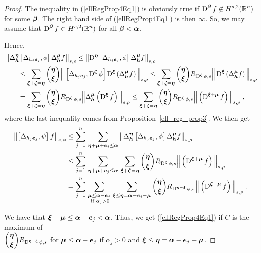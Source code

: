 \begin{proof}
The inequality in (\ref{ellRegProp4Eq1}) is obviously true if
$\displaystyle \operatorname{D}^{{\bm{\beta}}} f \not\in H^{s,2}(\mathbb{R}^n)$ for some
${\bm{\beta}}$.
The right hand side of (\ref{ellRegProp4Eq1}) is then $\infty$.  So, we may
assume that $\displaystyle \operatorname{D}^{{\bm{\beta}}} f \in H^{s,2}(\mathbb{R}^n)$ for all
${\bm{\beta}} < {\bm{\alpha}}$.

Hence,
\begin{align*}
&\left\| \Delta^{{\bm{\eta}}}_{{\bm{h}}} \left[
\Delta_{h_j {\bm{e}}_j}, \phi\right] \Delta^{{\bm{\mu}}}_{{\bm{h}}} f
\right\|_{s,\rho}
\leq \left\| \operatorname{D}^{{\bm{\eta}}} \left[ \Delta_{h_j {\bm{e}}_j}, \phi\right]
\Delta^{{\bm{\mu}}}_{{\bm{h}}} f\right\|_{s,\rho} \\
&\qquad \leq \sum_{{\bm{\xi}}+{\bm{\zeta}} = {\bm{\eta}}}
\binom{{\bm{\eta}}}{{\bm{\xi}}}
\Big\| \left[ \Delta_{h_j{\bm{e}}_j} , \operatorname{D}^{{\bm{\zeta}}} \phi \right]
\operatorname{D}^{{\bm{\xi}}} \left(\Delta^{{\bm{\mu}}}_{{\bm{h}}} f\right) \Big\|_{s,\rho}
\leq \sum_{{\bm{\xi}}+{\bm{\zeta}} = {\bm{\eta}}} \binom{{\bm{\eta}}}{{\bm{\xi}}}
R_{\operatorname{D}^{{\bm{\zeta}}} \phi,s}
\Big\| \operatorname{D}^{{\bm{\xi}}} \left(\Delta^{{\bm{\mu}}}_{{\bm{h}}} f\right)
\Big\|_{s,\rho} \\
&\qquad =\sum_{{\bm{\xi}}+{\bm{\zeta}} = {\bm{\eta}}}
\binom{{\bm{\eta}}}{{\bm{\xi}}} R_{\operatorname{D}^{{\bm{\zeta}}} \phi,s}
\Big\| \Delta^{{\bm{\mu}}}_{{\bm{h}}}
\left(\operatorname{D}^{{\bm{\xi}}} f\right) \Big\|_{s,\rho}
\leq \sum_{{\bm{\xi}}+{\bm{\zeta}} = {\bm{\eta}}} \binom{{\bm{\eta}}}{{\bm{\xi}}}
R_{\operatorname{D}^{{\bm{\zeta}}} \phi,s}
\Big\| \left(\operatorname{D}^{{\bm{\xi}}+{\bm{\mu}}} f\right) \Big\|_{s,\rho} \ ,
\end{align*}
where the last inequality comes from Proposition~\ref{ell_reg_prop3}.
We then get
\begin{align*}
\left\| \left[ \Delta_{h_j{\bm{e}}_j} ,\psi \right] f \right\|_{s,\rho}
&\leq \sum_{j=1}^n \, \sum_{{\bm{\eta}}+{\bm{\mu}}+{\bm{e}}_j \leq {\bm{\alpha}}}
\left\| \Delta^{{\bm{\eta}}}_{{\bm{h}}} \left[ \Delta_{h_j {\bm{e}}_j},
\phi\right] \Delta^{{\bm{\mu}}}_{{\bm{h}}} f \right\|_{s,\rho} \\
&\leq \sum_{j=1}^n \, \sum_{{\bm{\eta}}+{\bm{\mu}}+{\bm{e}}_j \leq {\bm{\alpha}}} \,
\sum_{{\bm{\xi}}+{\bm{\zeta}} = {\bm{\eta}}} \binom{{\bm{\eta}}}{{\bm{\xi}}}
R_{\operatorname{D}^{{\bm{\zeta}}} \phi,s}
\Big\| \left(\operatorname{D}^{{\bm{\xi}}+{\bm{\mu}}} f\right) \Big\|_{s,\rho} \\
&= \sum_{j=1}^n \, \sum_{\substack{{\bm{\mu}} \leq {\bm{\alpha}} - {\bm{e}}_j \\
\text{ if } \alpha_j >0}} \,
\sum_{{\bm{\xi}} \leq {\bm{\eta}} = {\bm{\alpha}} - {\bm{e}}_j - {\bm{\mu}}}
\binom{{\bm{\eta}}}{{\bm{\xi}}} R_{\operatorname{D}^{{\bm{\eta}}- {\bm{\xi}}} \phi,s}
\Big\| \left(\operatorname{D}^{{\bm{\xi}}+{\bm{\mu}}} f\right) \Big\|_{s,\rho} \ .
\end{align*}

We have that ${\bm{\xi}} + {\bm{\mu}} \leq {\bm{\alpha}} - {\bm{e}}_j <
{\bm{\alpha}}$.  Thus, we get (\ref{ellRegProp4Eq1}) if $C$ is the maximum of\\
$\displaystyle \binom{{\bm{\eta}}}{{\bm{\xi}}}
R_{\operatorname{D}^{{\bm{\eta}} - {\bm{\xi}}} \phi,s}$ for
${\bm{\mu}} \leq {\bm{\alpha}} - {\bm{e}}_j$ if $\alpha_j >0$ and
${\bm{\xi}} \leq {\bm{\eta}} = {\bm{\alpha}} - {\bm{e}}_j - {\bm{\mu}}$.
\end{proof}

